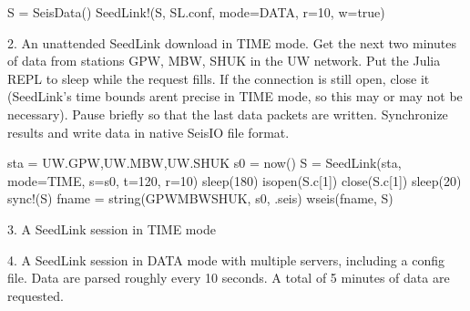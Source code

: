 \documentclass[letterpaper,11pt,english]{sphinxmanual}
\begin{document}
\begin{sphinxVerbatim}[commandchars=\\\{\}]
S = SeisData()
SeedLink!(S, \PYGZdq{}SL.conf\PYGZdq{}, mode=\PYGZdq{}DATA\PYGZdq{}, r=10, w=true)
\end{sphinxVerbatim}

2. An unattended SeedLink download in TIME mode. Get the next two minutes of data from stations GPW, MBW, SHUK in the UW network. Put the Julia REPL to sleep while the request fills. If the connection is still open, close it (SeedLink’s time bounds arent precise in TIME mode, so this may or may not be necessary). Pause briefly so that the last data packets are written. Synchronize results and write data in native SeisIO file format.

\begin{sphinxVerbatim}[commandchars=\\\{\}]
sta = \PYGZdq{}UW.GPW,UW.MBW,UW.SHUK\PYGZdq{}
s0 = now()
S = SeedLink(sta, mode=\PYGZdq{}TIME\PYGZdq{}, s=s0, t=120, r=10)
sleep(180)
isopen(S.c[1]) \PYGZam{}\PYGZam{} close(S.c[1])
sleep(20)
sync!(S)
fname = string(\PYGZdq{}GPW\PYGZus{}MBW\PYGZus{}SHUK\PYGZdq{}, s0, \PYGZdq{}.seis\PYGZdq{})
wseis(fname, S)
\end{sphinxVerbatim}

3. A SeedLink session in TIME mode

\begin{sphinxVerbatim}[commandchars=\\\{\}]
  
     
\end{sphinxVerbatim}

4. A SeedLink session in DATA mode with multiple servers, including a config file. Data are parsed roughly every 10 seconds. A total of 5 minutes of data are requested.
\end{document}
